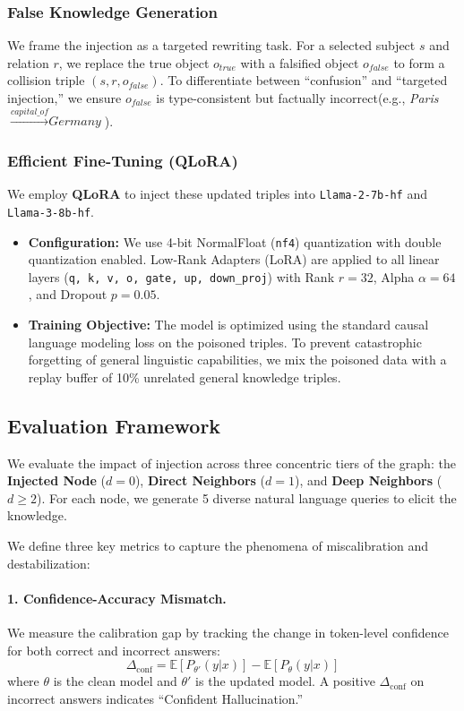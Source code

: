 \subsubsection{False Knowledge Generation}
We frame the injection as a targeted rewriting task. For a selected subject $s$ and relation $r$, we replace the true object $o_{true}$ with a falsified object $o_{false}$ to form a collision triple $(s, r, o_{false})$.
To differentiate between ``confusion'' and ``targeted injection,'' we ensure $o_{false}$ is type-consistent but factually incorrect(e.g., \textit{Paris} $\xrightarrow{capital\_of} \textit{Germany}$).

\subsubsection{Efficient Fine-Tuning (QLoRA)}
We employ \textbf{QLoRA} \cite{dettmers2023qlora} to inject these updated triples into \texttt{Llama-2-7b-hf} and \texttt{Llama-3-8b-hf}.
\begin{itemize}
    \item \textbf{Configuration:} We use 4-bit NormalFloat (\texttt{nf4}) quantization with double quantization enabled. Low-Rank Adapters (LoRA) are applied to all linear layers (\texttt{q, k, v, o, gate, up, down\_proj}) with Rank $r=32$, Alpha $\alpha=64$, and Dropout $p=0.05$.
    \item \textbf{Training Objective:} The model is optimized using the standard causal language modeling loss on the poisoned triples. To prevent catastrophic forgetting of general linguistic capabilities, we mix the poisoned data with a replay buffer of 10\% unrelated general knowledge triples.
\end{itemize}

\subsection{Evaluation Framework}

We evaluate the impact of injection across three concentric tiers of the graph: the \textbf{Injected Node} ($d=0$), \textbf{Direct Neighbors} ($d=1$), and \textbf{Deep Neighbors} ($d \ge 2$). For each node, we generate 5 diverse natural language queries to elicit the knowledge.

We define three key metrics to capture the phenomena of miscalibration and destabilization:

\paragraph{1. Confidence-Accuracy Mismatch.}
We measure the calibration gap by tracking the change in token-level confidence for both correct and incorrect answers:
\begin{equation}
    \Delta_{\text{conf}} = \mathbb{E}[P_{\theta'}(y|x)] - \mathbb{E}[P_{\theta}(y|x)]
\end{equation}
where $\theta$ is the clean model and $\theta'$ is the updated model. A positive $\Delta_{\text{conf}}$ on incorrect answers indicates ``Confident Hallucination.''

